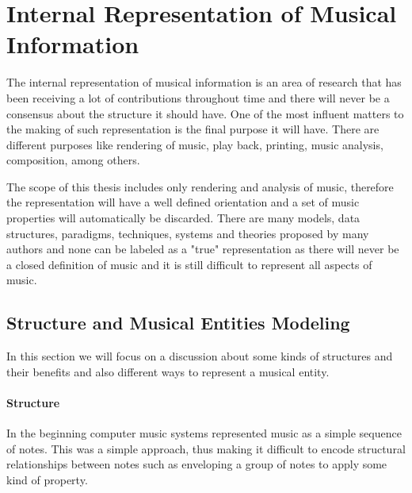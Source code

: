 \documentclass[main.tex]{files}
\begin{document}
\chapter{Internal Representation of Musical Information}
% 

The internal representation of musical information is an area of research that has been receiving
a lot of contributions throughout time and there will never be a consensus about the structure
it should have. One of the most influent matters to the making of such representation is the
final purpose it will have. There are different purposes like rendering of music, play back,
printing, music analysis, composition, among others.

The scope of this thesis includes only rendering and analysis of music, therefore the
representation will have a well defined orientation and a set of music properties will
automatically be discarded. There are many models, data structures, paradigms, techniques,
systems and theories proposed by many authors and none can be labeled as a "true" representation as
there will never be a closed definition of music and it is still difficult to represent all aspects
of music.

\section{Structure and Musical Entities Modeling}
In this section we will focus on a discussion about some kinds of structures and their benefits and
also different ways to represent a musical entity.

\subsubsection{Structure}

    In the beginning computer music systems represented music as a simple sequence of notes. This
    was a simple approach, thus making it difficult to encode structural relationships between
    notes such as enveloping a group of notes to apply some kind of property.
\end{document}
